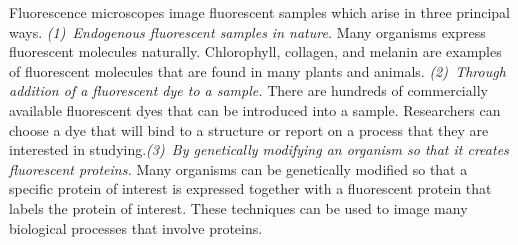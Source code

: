 \documentclass[11pt]{article}
\begin{document}
Fluorescence microscopes image fluorescent samples which arise in three
principal ways. \textit{(1)~Endogenous fluorescent samples in nature.} Many
organisms express fluorescent molecules naturally. Chlorophyll, collagen, and
melanin are examples of fluorescent molecules that are found in many plants and
animals. \textit{(2)~Through addition of a fluorescent dye to a sample.}  There
are hundreds of commercially available fluorescent dyes that can be introduced
into a sample. Researchers can choose a dye that will bind to a structure or
report on a process that they are interested in
studying.\hspace{0.4em}\textit{(3)~By genetically modifying an organism so that
  it creates fluorescent proteins.}  Many organisms can be genetically modified
so that a specific protein of interest is expressed together with a fluorescent
protein that labels the protein of interest. These techniques can be used to
image many biological processes that involve proteins.
\end{document}
